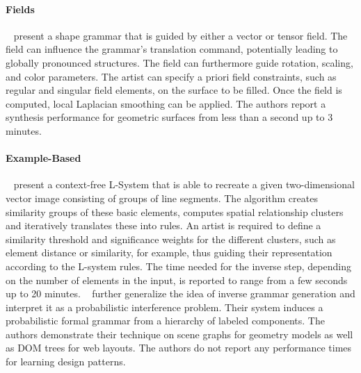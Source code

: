 \paragraph*{Fields}
\label{para:analysis_rulebased_fields}

  \citeauthor*{yuanyuan_2011_gso}~\cite{yuanyuan_2011_gso} present a shape grammar that is guided by either a vector or tensor field. The field can influence the grammar's translation command, potentially leading to globally pronounced structures. The field can furthermore guide rotation, scaling, and color parameters. The artist can specify a priori field constraints, such as regular and singular field elements, on the surface to be filled. Once the field is computed, local Laplacian smoothing can be applied. The authors report a synthesis performance for geometric surfaces from less than a second up to 3 minutes. 


\paragraph*{Example-Based}
\label{para:analysis_rulebased_example}

\citeauthor*{stava_2010_ipm}~\cite{stava_2010_ipm} present a context-free L-System that is able to recreate a given two-dimensional vector image consisting of groups of line segments. The algorithm creates similarity groups of these basic elements, computes spatial relationship clusters and iteratively translates these into rules. An artist is required to define a similarity threshold and significance weights for the different clusters, such as element distance or similarity, for example, thus guiding their representation according to the L-system rules. The time needed for the inverse step, depending on the number of elements in the input, is reported to range from a few seconds up to 20 minutes. \citeauthor*{talton_2012_ldp}~\cite{talton_2012_ldp} further generalize the idea of inverse grammar generation and interpret it as a probabilistic interference problem. Their system induces a probabilistic formal grammar from a hierarchy of labeled components. The authors demonstrate their technique on scene graphs for geometry models as well as DOM trees for web layouts. The authors do not report any performance times for learning design patterns.


